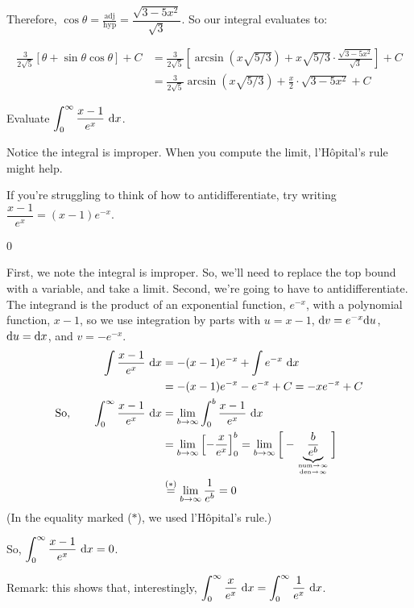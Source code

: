 \begin{solution}
\begin{center}
\end{center}

Therefore, $\cos\theta = \frac{\mbox{adj}}{\mbox{hyp}} = \dfrac{\sqrt{3-5x^2}}{\sqrt{3}}$. So our integral evaluates to:

\begin{align*}
\frac{3}{2\sqrt{5}}\left[
\theta + \sin\theta\cos\theta
\right]+C&=
\frac{3}{2\sqrt{5}}\left[
\arcsin(x\sqrt{5/3}) + x\sqrt{5/3}\cdot \frac{\sqrt{3-5x^2}}{\sqrt{3}}
\right]+C\\
&=
\frac{3}{2\sqrt{5}}
\arcsin(x\sqrt{5/3}) + \frac{x}{2}\cdot {\sqrt{3-5x^2}}
+C
\end{align*}
\end{solution}

\begin{question}
Evaluate $\displaystyle\int_0^\infty \dfrac{x-1}{e^x}~\mathrm{d}x$.
\end{question}
\begin{hint}
Notice the integral is improper. When you compute the limit, l'H\^{o}pital's rule might help.

If you're struggling to think of how to antidifferentiate, try writing $\dfrac{x-1}{e^x} = (x-1)e^{-x}$.
\end{hint}
\begin{answer}
0
\end{answer}
\begin{solution}
First, we note the integral is improper. So, we'll need to replace the top bound with a variable, and take a limit. Second, we're going to have to antidifferentiate. The integrand is the product of an exponential function, $e^{-x}$, with a polynomial function, $x-1$, so we use integration by parts with $u=x-1$, $\mathrm{d}v=e^{-x}\mathrm{d}u$, $\mathrm{d}u=\mathrm{d}x$, and $v = -e^{-x}$.
\begin{align*}
\int \dfrac{x-1}{e^x}~\dee{x}&=-(x-1)e^{-x} + \int e^{-x}~\dee{x}
\\&=-(x-1)e^{-x} -e^{-x}+C
=-xe^{-x}+C\\
\text{So,}\qquad\int_0^\infty \dfrac{x-1}{e^x}~\dee{x} & = \lim_{b \to \infty}\int_0^b \dfrac{x-1}{e^x}~\dee{x}\\
& = \lim_{b \to \infty}\left[-\frac{x}{e^x}\right]_0^b = \lim_{b \to \infty}\bigg[-\underbrace{\frac{b}{e^b}}_{\atp{\mathrm{num}\to\infty}{\mathrm{den}\to\infty}}\bigg]\\
& \stackrel{(*)}{=} \lim_{b \to \infty}\frac{1}{e^b}=0
\end{align*}
(In the equality marked ($*$), we used l'H\^{o}pital's rule.)

So, $\displaystyle\int_0^\infty \dfrac{x-1}{e^x}~\mathrm{d}x=0$.

Remark: this shows that, interestingly, $\displaystyle\int_0^\infty \dfrac{x}{e^x}~\mathrm{d}x=\displaystyle\int_0^\infty \dfrac{1}{e^x}~\mathrm{d}x$.
\end{solution}



